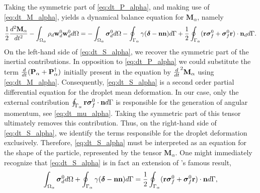 Taking the symmetric part of \ref{eq:dt_P_alpha}, and making use of \ref{eq:dt_M_alpha}, yields a dynamical balance equation for $\textbf{M}_\alpha$, namely
\begin{equation}    
    \frac{1}{2}\frac{d^2 \textbf{M}_\alpha}{dt^2}
    - \int_{\Omega_{\alpha}}  \rho_d  \textbf{w}_d^0 \textbf{w}_d^0  d\Omega
    = 
    - \int_{\Omega_{\alpha}} \bm{\sigma}_d^0 d\Omega
    - \oint_{\Gamma_{\alpha}} \gamma (\bm\delta - \textbf{nn}) d\Gamma
    + \frac{1}{2}\oint_{\Gamma_{\alpha}} (\textbf{r}\bm{\sigma}_f^0+\bm{\sigma}_f^0 \textbf{r})\cdot \textbf{n}_d d\Gamma.
    \label{eq:dt_S_alpha}
\end{equation}
On the left-hand side of \ref{eq:dt_S_alpha}, we recover the symmetric part of the inertial contributions. 
In opposition to \ref{eq:dt_P_alpha} we could substitute the term $\frac{d}{dt} (\textbf{P}_\alpha+\textbf{P}_\alpha^\dagger)$ initially present in the equation by $\frac{d}{dt}^2 \textbf{M}_\alpha$ using \ref{eq:dt_M_alpha}. 
Consequently, \ref{eq:dt_S_alpha} is a second order partial differential equation for the droplet mean deformation. 
In our case, only the external contribution $\oint_{\Gamma_{\alpha}} \textbf{r}\bm\sigma_f^0\cdot \textbf{n} d\Gamma$ is responsible for the generation of angular momentum, see \ref{eq:dt_mu_alpha}.
Taking the symmetric part of this tensor ultimately removes this contribution. 
Thus, on the right-hand side of \ref{eq:dt_S_alpha}, we identify the terms responsible for the droplet deformation exclusively.
Therefore, \ref{eq:dt_S_alpha} must be interpreted as an equation for the shape of the particle, represented by the tensor $\textbf{M}_\alpha$.
One might immediately recognize that \ref{eq:dt_S_alpha} is in fact an extension of \citet{batchelor1970stress}'s famous result, 
\begin{equation}
    \int_{\Omega_{\alpha}} \bm{\sigma}_d^0 d\Omega
    + \oint_{\Gamma_{\alpha}} \gamma(\bm\delta - \textbf{nn}) d\Gamma
    = \frac{1}{2}\oint_{\Gamma_{\alpha}} (\textbf{r}\bm\sigma_f^0+\bm\sigma_f^0\textbf{r})\cdot \textbf{n} d\Gamma,
    \label{eq:Batchelor}
\end{equation}
